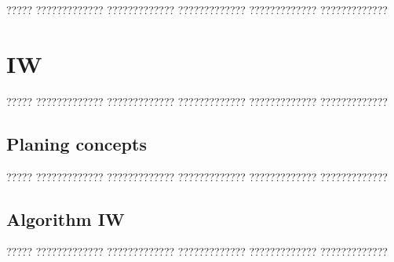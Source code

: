 ????? ????????????? ????????????? ????????????? ????????????? ????????????? 


\section{IW}


????? ????????????? ????????????? ????????????? ????????????? ????????????? 
\subsection{Planing concepts}

????? ????????????? ????????????? ????????????? ????????????? ????????????? 

\subsection{Algorithm IW}
????? ????????????? ????????????? ????????????? ????????????? ????????????? 